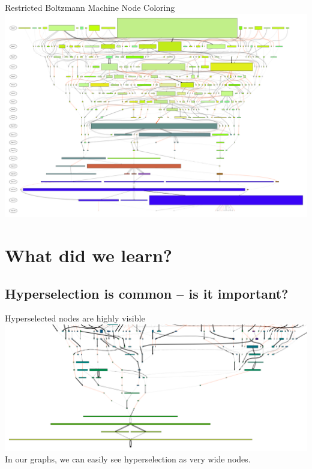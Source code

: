 \documentclass{beamer}
\begin{document}
\begin{frame}{Restricted Boltzmann Machine Node Coloring}
\centering
\includegraphics[width=.9\textwidth]{Illustrations/run0_RBM_color_full_30000.pdf}
\end{frame}



\section{What did we learn?}

\subsection{Hyperselection is common -- is it important?}
\begin{frame}{Hyperselected nodes are highly visible}
\center \includegraphics[width=\textwidth]{Illustrations/cropped.pdf} \\
In our graphs, we can easily see hyperselection as very wide nodes. 
\end{frame}
\end{document}

